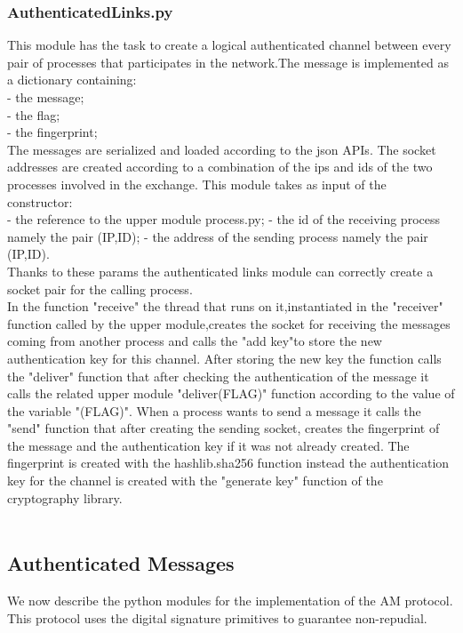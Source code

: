 \documentclass[12pt]{article}
\begin{document}
\subsubsection{AuthenticatedLinks.py}
This module has the task to create a logical authenticated channel between every pair of processes that participates in the network.The message is implemented as a dictionary containing:\\
- the message;\\
- the flag;\\
- the fingerprint;\\
The messages are serialized and loaded according to the json APIs.
The socket addresses are created according to a combination of the ips and ids of the two processes involved in the exchange. 
This module takes as input of the constructor: \\
- the reference to the upper module process.py;
- the id of the receiving process namely the pair (IP,ID);
- the address of the sending process namely the pair (IP,ID).\\
Thanks to these params the authenticated links module can correctly create a socket pair for the calling process.\\
In the function "receive" the thread that runs on it,instantiated in the "receiver" function called by the upper module,creates the socket for receiving the messages coming from another process and calls the "add key"to store the new authentication key for this channel. After storing the new key the function calls the "deliver" function that after checking the authentication of the message it calls the related upper module "deliver(FLAG)" function according to the value of the variable "(FLAG)".
When a process wants to send a message it calls the "send" function that after creating the sending socket, creates the fingerprint of the message and the authentication key if it was not already created. The fingerprint is created with the hashlib.sha256 function instead the authentication key for the channel is created with the "generate key" function of the cryptography library. \\
\\
\subsection{Authenticated Messages}
We now describe the python modules for the implementation of the AM protocol. This protocol uses the digital signature primitives to guarantee non-repudial. \\
\end{document}
